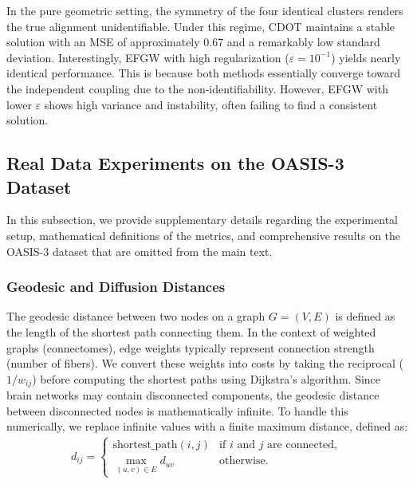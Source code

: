 \documentclass{article}
\theoremstyle{plain}
\theoremstyle{definition}
\theoremstyle{remark}
\begin{document}
In the pure geometric setting, the symmetry of the four identical clusters renders the true alignment unidentifiable. Under this regime, CDOT maintains a stable solution with an MSE of approximately $0.67$ and a remarkably low standard deviation. Interestingly, EFGW with high regularization ($\varepsilon=10^{-1}$) yields nearly identical performance. This is because both methods essentially converge toward the independent coupling due to the non-identifiability. However, EFGW with lower $\varepsilon$ shows high variance and instability, often failing to find a consistent solution.

\subsection{Real Data Experiments on the OASIS-3 Dataset}\label{App:oasis-3}

In this subsection, we provide supplementary details regarding the experimental setup, mathematical definitions of the metrics, and comprehensive results on the OASIS-3 dataset that are omitted from the main text.

\subsubsection{Geodesic and Diffusion Distances}

The geodesic distance between two nodes on a graph $G = (V,E)$ is defined as the length of the shortest path connecting them. In the context of weighted graphs (connectomes), edge weights typically represent connection strength (number of fibers). We convert these weights into costs by taking the reciprocal ($1/w_{ij}$) before computing the shortest paths using Dijkstra's algorithm. Since brain networks may contain disconnected components, the geodesic distance between disconnected nodes is mathematically infinite. To handle this numerically, we replace infinite values with a finite maximum distance, defined as:
\begin{align*}
	d_{ij} = \begin{cases}
		\text{shortest\_path}(i, j) & \text{if $i$ and $j$ are connected}, \\
		\max_{(u,v) \in E} d_{uv} & \text{otherwise}.
	\end{cases}
\end{align*}
\end{document}
